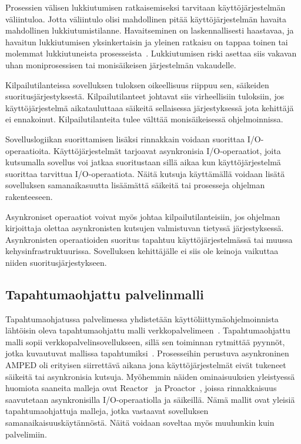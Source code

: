 \documentclass[finnish]{tktltiki2}
\theoremstyle{definition}
\theoremstyle{remark}
\begin{document}
Prosessien välisen lukkiutumisen ratkaisemiseksi tarvitaan
käyttöjärjestelmän väliintuloa. Jotta väliintulo olisi mahdollinen pitää
käyttöjärjestelmän havaita mahdollinen lukkiutumistilanne.
Havaitseminen on laskennallisesti haastavaa, ja havaitun lukkiutumisen
yksinkertaisin ja yleinen ratkaisu on tappaa toinen
tai molemmat lukkiutuneista prosesseista~\cite{stallings_operating_2018}.
Lukkiutumisen riski asettaa siis vakavan uhan moniprosessisen tai monisäikeisen
järjestelmän vakaudelle.

Kilpailutilanteissa sovelluksen tuloksen oikeellisuus riippuu sen,
säikeiden suoritusjärjestyksestä. Kilpailutilanteet johtavat siis
virheellisiin tuloksiin, jos käyttöjärjestelmä aikatauluttaaa
säikeitä sellaisessa järjestyksessä jota kehittäjä ei ennakoinut.
Kilpailutilanteita tulee välttää monisäikeisessä ohjelmoinnissa.

Sovelluslogiikan suorittamisen lisäksi rinnakkain voidaan suorittaa I/O-operaatioita.
Käyttöjärjestelmät tarjoavat asynkronisia I/O-operaatiot, joita kutsumalla
sovellus voi jatkaa suoritustaan sillä aikaa kun käyttöjärjestelmä
suorittaa tarvittua I/O-operaatiota. Näitä kutsuja käyttämällä voidaan
lisätä sovelluksen samanaikasuutta lisäämättä säikeitä
tai prosesseja ohjelman rakenteeseen.

Asynkroniset operaatiot voivat myös johtaa kilpailutilanteisiin,
jos ohjelman kirjoittaja olettaa asynkronisten kutsujen
valmistuvan tietyssä järjestyksessä. Asynkronisten operaatioiden
suoritus tapahtuu käyttöjärjestelmässä tai muussa kehysinfrastruktuurissa.
Sovelluksen kehittäjälle ei siis ole keinoja vaikuttaa
niiden suoritusjärjestykseen.

\subsection{Tapahtumaohjattu palvelinmalli}

Tapahtumaohjatussa palvelimessa yhdistetään
käyttöliittymäohjelmoinnista lähtöisin oleva tapahtumaohjattu malli
verkkopalvelimeen~\cite{pai_flash:_1999}. Tapahtumaohjattu malli sopii verkkopalvelinsovellukseen,
sillä sen toiminnan rytmittää pyynnöt, jotka
kuvautuvat mallissa tapahtumiksi~\cite{schmidt_reactor:_1995}.
Prosesseihin perustuva asynkroninen AMPED\cite{pai_flash:_1999}
oli erityisen siirrettävä aikana jona käyttöjärjestelmät
eivät tukeneet säikeitä tai asynkronisia kutsuja.
Myöhemmin näiden ominaisuuksien yleistyessä
huomiota saaneita malleja ovat Reactor~\cite{schmidt_reactor:_1995}
ja Proactor~\cite{pyarali_proactor_1997}, joissa
rinnakkaisuus saavutetaan asynkronisilla I/O-operaatiolla
ja säikeillä. Nämä mallit ovat yleisiä tapahtumaohjattuja malleja, jotka
vastaavat sovelluksen samanaikaisuuskäytännöstä.
Näitä voidaan soveltaa myös muuhunkin kuin palvelimiin.
\end{document}
